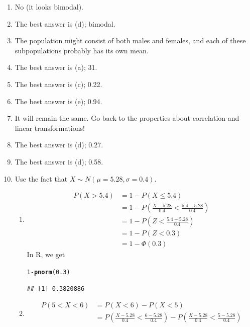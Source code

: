 \documentclass{article}\usepackage[]{graphicx}\usepackage[]{color}
\makeatletter
\newcommand{\hlnum}[1]{\textcolor[rgb]{0.686,0.059,0.569}{#1}}%
\newcommand{\hlopt}[1]{\textcolor[rgb]{0,0,0}{#1}}%
\newcommand{\hlstd}[1]{\textcolor[rgb]{0.345,0.345,0.345}{#1}}%
\newcommand{\hlkwd}[1]{\textcolor[rgb]{0.737,0.353,0.396}{\textbf{#1}}}%
\newenvironment{kframe}{%
 \def\at@end@of@kframe{}%
 \ifinner\ifhmode%
  \def\at@end@of@kframe{\end{minipage}}%
  \begin{minipage}{\columnwidth}%
 \fi\fi%
 \def\FrameCommand##1{\hskip\@totalleftmargin \hskip-\fboxsep
 \colorbox{shadecolor}{##1}\hskip-\fboxsep
     \hskip-\linewidth \hskip-\@totalleftmargin \hskip\columnwidth}%
 \MakeFramed {\advance\hsize-\width
   \@totalleftmargin\z@ \linewidth\hsize
   \@setminipage}}%
 {\par\unskip\endMakeFramed%
 \at@end@of@kframe}
\newenvironment{knitrout}{}{} %
\makeatother
\begin{document}
\begin{enumerate}
  \item No (it looks bimodal).
  \item The best answer is (d); bimodal.
  \item The population might consist of both males and females, and each of these subpopulations probably has its own mean.
  \item The best answer is (a); 31.
  \item The best answer is (c); 0.22.
  \item The best answer is (e); 0.94.
  \item It will remain the same. Go back to the properties about correlation and linear transformations!
  \item The best answer is (d); 0.27.
  \item The best answer is (d); 0.58.
  \item Use the fact that $X \sim N\left(\mu = 5.28, \sigma = 0.4\right)$.
  \begin{enumerate}
    \item \begin{align*}
             P\left(X > 5.4\right) &= 1 - P\left(X \le 5.4 \right) \\
             &= 1 - P\left(\frac{X - 5.28}{0.4} < \frac{5.4 - 5.28}{0.4}\right) \\
             &= 1 - P\left(Z < \frac{5.4 - 5.28}{0.4}\right) \\
             &= 1 - P\left(Z < 0.3\right) \\
             &= 1 - \Phi\left(0.3\right)
          \end{align*}
          In R, we get
\begin{knitrout}
\color{fgcolor}\begin{kframe}
\begin{alltt}
\hlnum{1} \hlopt{-} \hlkwd{pnorm}\hlstd{(}\hlnum{0.3}\hlstd{)}
\end{alltt}
\begin{verbatim}
## [1] 0.3820886
\end{verbatim}
\end{kframe}
\end{knitrout}
    \item \begin{align*}
             P\left(5 < X < 6\right) &= P\left(X < 6 \right) - P\left(X < 5 \right) \\
             &= P\left(\frac{X - 5.28}{0.4} < \frac{6 - 5.28}{0.4}\right) - P\left(\frac{X - 5.28}{0.4} < \frac{5 - 5.28}{0.4}\right) \\

\end{align*}
\end{enumerate}
\end{enumerate}
\end{document}
